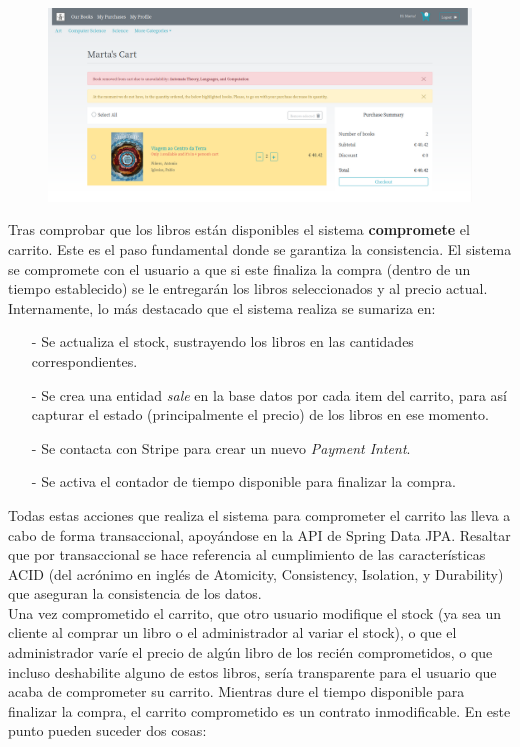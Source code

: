 \documentclass[a4paper]{report}
\begin{document}
    \begin{figure}[hbt!]
    	\centering
    	\includegraphics[width=\textwidth]{cart_alert}
    \end{figure}
    
    Tras comprobar que los libros están disponibles el sistema \textbf{compromete} el carrito. Este es el paso fundamental donde se garantiza la consistencia. El sistema se compromete con el usuario a que si este finaliza la compra (dentro de un tiempo establecido) se le entregarán los libros seleccionados y al precio actual. Internamente, lo más destacado que el sistema realiza se sumariza en:
    
    \begin{itemize}
    	\item[-] Se actualiza el stock, sustrayendo los libros en las cantidades correspondientes.
    	\item[-] Se crea una entidad \emph{sale} en la base datos por cada item del carrito, para así capturar el estado (principalmente el precio) de los libros en ese momento.
    	\item[-] Se contacta con Stripe para crear un nuevo \emph{Payment Intent}.
    	\item[-] Se activa el contador de tiempo disponible para finalizar la compra.
    \end{itemize}
    
    Todas estas acciones que realiza el sistema para comprometer el carrito las lleva a cabo de forma transaccional, apoyándose en la API de Spring Data JPA. Resaltar que por transaccional se hace referencia al cumplimiento de las características ACID (del acrónimo en inglés de Atomicity, Consistency, Isolation, y Durability) que aseguran la consistencia de los datos.
    \\
    
    Una vez comprometido el carrito, que otro usuario modifique el stock (ya sea un cliente al comprar un libro o el administrador al variar el stock), o que el administrador varíe el precio de algún libro de los recién comprometidos, o que incluso deshabilite alguno de estos libros, sería transparente para el usuario que acaba de comprometer su carrito. Mientras dure el tiempo disponible para finalizar la compra, el carrito comprometido es un contrato inmodificable. En este punto pueden suceder dos cosas: 
    
\end{document}
